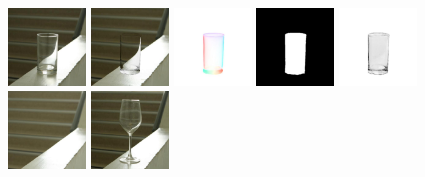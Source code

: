     \includegraphics[width=0.155\textwidth]{ch-tomnet/images/Limitation/natural_23_023_IMG_5052crop_7_tar.jpg}
    \includegraphics[width=0.155\textwidth]{ch-tomnet/images/Limitation/natural_23_023_IMG_5052crop_5_final_r.jpg}
    \includegraphics[width=0.155\textwidth]{ch-tomnet/images/Limitation/natural_23_023_IMG_5052crop_1_fcolor_r.jpg}
    \includegraphics[width=0.155\textwidth]{ch-tomnet/images/Limitation/natural_23_023_IMG_5052crop_3_mask_r.jpg}
    \includegraphics[width=0.155\textwidth]{ch-tomnet/images/Limitation/natural_23_023_IMG_5052crop_4_rho_r.jpg}
\\
    \includegraphics[width=0.155\textwidth]{ch-tomnet/images/Limitation/natural_29_029_IMG_5058crop_0_ref.jpg}
    \includegraphics[width=0.155\textwidth]{ch-tomnet/images/Limitation/natural_29_029_IMG_5058crop_7_tar.jpg}
